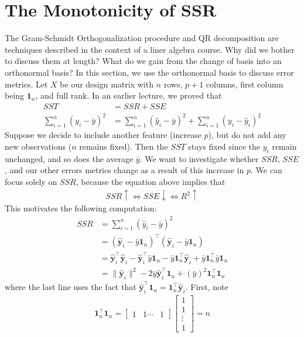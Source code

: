 \documentclass[12pt, a4paper]{article}
\theoremstyle{definition}
\begin{document}
	\section*{The Monotonicity of SSR}
	The Gram-Schmidt Orthogonalization procedure and QR decomposition are techniques
	described in the context of a liner algebra course. Why did we bother
	to discuss them at length? What do we gain from the change of basis into an
	orthonormal basis? In this section, we use the orthonormal basis to discuss
	error metrics. Let $X$ be our design matrix with $n$ rows, $p+1$ columns,
	first column being $\mathbf{1}_{n}$, and full rank. In an earlier lecture, we proved
	that
	\begin{align*}
		SST &= SSR + SSE\\
		\sum_{i=1}^{n}(y_i-\bar{y})^2 &= \sum_{i=1}^{n}(\hat{y}_i-\bar{y})^2 + \sum_{i=1}^{n}(y_i-\hat{y}_i)^2
	\end{align*}
	Suppose we decide to include another feature (increase $p$), but do not add
	any new observations ($n$ remains fixed). Then the $SST$ stays fixed since
	the $y_i$ remain unchanged, and so does the average $\bar{y}$. We want to
	investigate whether $SSR$, $SSE$, and our other errors metrics change as a result
	of this increase in $p$. We can focus solely on $SSR$, because the equation above
	implies that
	\begin{align*}
		SSR\uparrow \iff SSE\downarrow \iff R^2\uparrow 
	\end{align*}
	This motivates the following computation:
	\begin{align}
		SSR
		&= \sum_{i=1}^{n}(\hat{y}_i-\bar{y})^2\nonumber\\
		&=(\mathbf{\hat{y}}_i-\bar{y}\mathbf{1}_n)^\top
		(\mathbf{\hat{y}}_i-\bar{y}\mathbf{1}_n)\nonumber\\
		&=\mathbf{\hat{y}}_i^\top\mathbf{\hat{y}}_i-\mathbf{\hat{y}}_i^\top\bar{y}\mathbf{1}_n
		-\bar{y}\mathbf{1}_n^\top\mathbf{\hat{y}}_i + \bar{y}\mathbf{1}_n^\top \bar{y}\mathbf{1}_n\nonumber\\
		&=\|\mathbf{\hat{y}}_i\|^2-2\bar{y}\mathbf{\hat{y}}_i^\top\mathbf{1}_n
		+ (\bar{y})^2\mathbf{1}_n^\top\mathbf{1}_n
		\label{eqn:ssr-motiv}
	\end{align}
	where the last line uses the fact that
	$\mathbf{\hat{y}}_i^\top\mathbf{1}_n = \mathbf{1}_n^\top\mathbf{\hat{y}}_i$.
	First, note
	\begin{align*}
		\mathbf{1}_n^\top\mathbf{1}_n=\begin{bmatrix}
			1 & 1 \cdots & 1
		\end{bmatrix}
		\begin{bmatrix}
			1\\
			1\\
			\vdots\\
			1
		\end{bmatrix}
		=n
	\end{align*}
\end{document}
